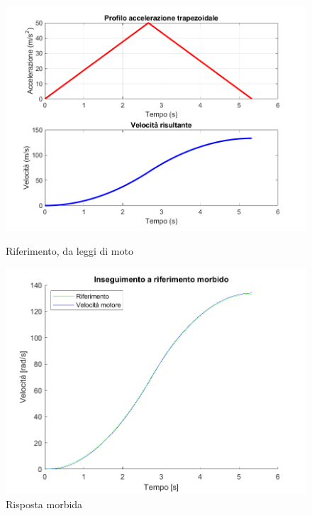 \documentclass[a4paper,12pt]{article}
\begin{document}
\begin{figure}[h!]
    \centering
    \begin{minipage}{0.48\textwidth}
        \centering
        \includegraphics[scale = 0.5]{Immagini/PlotMatlab/leggiMotoDaFermo.png}
        \caption{Riferimento, da leggi di moto}
        \label{fig: leggiDIMoto}
    \end{minipage}\hfill
    \begin{minipage}{0.48\textwidth}
        \centering
        \includegraphics[scale = 0.5]{Immagini/PlotMatlab/rispostaLeggiMoto.png}
        \caption{Risposta morbida}
        \label{fig: rispostaMorbida}
    \end{minipage}
\end{figure}
\end{document}
